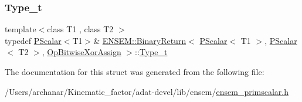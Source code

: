 \mbox{\label{structENSEM_1_1BinaryReturn_3_01PScalar_3_01T1_01_4_00_01PScalar_3_01T2_01_4_00_01OpBitwiseXorAssign_01_4_ad0194688bf01b3c6a40e163fb5235e3c}} 
\subsubsection{\texorpdfstring{Type\_t}{Type\_t}\hspace{0.1cm}{\footnotesize\ttfamily [3/3]}}
{\footnotesize\ttfamily template$<$class T1 , class T2 $>$ \\
typedef \mbox{\hyperlink{classENSEM_1_1PScalar}{P\+Scalar}}$<$T1$>$\& \mbox{\hyperlink{structENSEM_1_1BinaryReturn}{E\+N\+S\+E\+M\+::\+Binary\+Return}}$<$ \mbox{\hyperlink{classENSEM_1_1PScalar}{P\+Scalar}}$<$ T1 $>$, \mbox{\hyperlink{classENSEM_1_1PScalar}{P\+Scalar}}$<$ T2 $>$, \mbox{\hyperlink{structENSEM_1_1OpBitwiseXorAssign}{Op\+Bitwise\+Xor\+Assign}} $>$\+::\mbox{\hyperlink{structENSEM_1_1BinaryReturn_3_01PScalar_3_01T1_01_4_00_01PScalar_3_01T2_01_4_00_01OpBitwiseXorAssign_01_4_ad0194688bf01b3c6a40e163fb5235e3c}{Type\+\_\+t}}}



The documentation for this struct was generated from the following file\+:\begin{DoxyCompactItemize}
\item 
/\+Users/archanar/\+Kinematic\+\_\+factor/adat-\/devel/lib/ensem/\mbox{\hyperlink{adat-devel_2lib_2ensem_2ensem__primscalar_8h}{ensem\+\_\+primscalar.\+h}}\end{DoxyCompactItemize}
